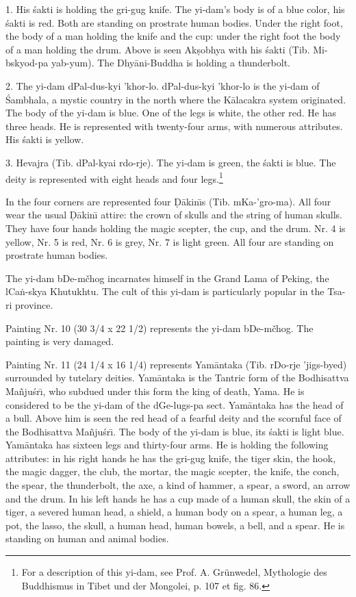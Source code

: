 \documentclass[a4paper, 12pt, oneside]{article}
\begin{document}
1. His \'{s}akti is holding the gri-gug knife. The yi-dam's body is of a blue color, his \'{s}akti is red. Both are standing on prostrate human bodies. Under the right foot, the body of a man holding the knife and the cup: under the right foot the body of a man holding the drum. Above is seen Ak\d{s}obhya with his \'{s}akti (Tib. Mi-bskyod-pa yab-yum). The Dhy\={a}ni-Buddha is holding a thunderbolt.

2. The yi-dam dPal-dus-kyi 'khor-lo. dPal-dus-kyi 'khor-lo is the yi-dam of \'{S}ambhala, a mystic country in the north where the K\={a}lacakra system originated. The body of the yi-dam is blue. One of the legs is white, the other red. He has three heads. He is represented with twenty-four arms, with numerous attributes. His \'{s}akti is yellow.

3. Hevajra (Tib. dPal-kyai rdo-rje). The yi-dam is green, the \'{s}akti is blue. The deity is represented with eight heads and four legs.\footnote{For a description of this yi-dam, see Prof. A. Grünwedel, Mythologie des Buddhismus in Tibet und der Mongolei, p. 107 et fig. 86.}

In the four corners are represented four \d{D}\={a}kin\={\i}s (Tib. mKa-'gro-ma). All four wear the usual \d{D}\={a}kin\={\i} attire: the crown of skulls and the string of human skulls. They have four hands holding the magic scepter, the cup, and the drum. Nr. 4 is yellow, Nr. 5 is red, Nr. 6 is grey, Nr. 7 is light green. All four are standing on prostrate human bodies.

The yi-dam bDe-mčhog incarnates himself in the Grand Lama of Peking, the lCa\.{n}-skya Khutukhtu. The cult of this yi-dam is particularly popular in the Tsa-ri province.

\bigskip

Painting Nr. 10 (30 3/4 x 22 1/2) represents the yi-dam bDe-mčhog. The painting is very damaged.

\bigskip

Painting Nr. 11 (24 1/4 x 16 1/4) represents Yam\={a}ntaka (Tib. rDo-rje 'jigs-byed) surrounded by tutelary deities. Yam\={a}ntaka is the Tantric form of the Bodhisattva Ma\~{n}ju\'{s}r\={\i}, who subdued under this form the king of death, Yama. He is considered to be the yi-dam of the dGe-lugs-pa sect. Yam\={a}ntaka has the head of a bull. Above him is seen the red head of a fearful deity and the scornful face of the Bodhisattva Ma\~{n}ju\'{s}r\={\i}. The body of the yi-dam is blue, its \'{s}akti is light blue. Yam\={a}ntaka has sixteen legs and thirty-four arms. He is holding the following attributes: in his right hands he has the gri-gug knife, the tiger skin, the hook, the magic dagger, the club, the mortar, the magic scepter, the knife, the conch, the spear, the thunderbolt, the axe, a kind of hammer, a spear, a sword, an arrow and the drum. In his left hands he has a cup made of a human skull, the skin of a tiger, a severed human head, a shield, a human body on a spear, a human leg, a pot, the lasso, the skull, a human head, human bowels, a bell, and a spear. He is standing on human and animal bodies.
\end{document}
